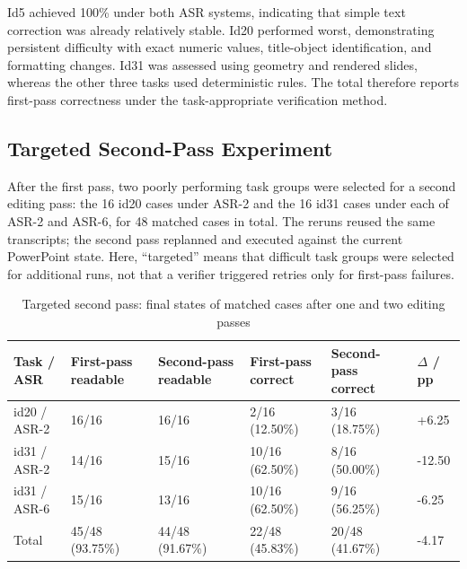 \documentclass[11pt,a4paper,UTF8,fontset=fandol]{ctexart}
\begin{document}
Id5 achieved 100\% under both ASR systems, indicating that simple text correction was already relatively stable. Id20 performed worst, demonstrating persistent difficulty with exact numeric values, title-object identification, and formatting changes. Id31 was assessed using geometry and rendered slides, whereas the other three tasks used deterministic rules. The total therefore reports first-pass correctness under the task-appropriate verification method.

\subsection{Targeted Second-Pass Experiment}

After the first pass, two poorly performing task groups were selected for a second editing pass: the 16 id20 cases under ASR-2 and the 16 id31 cases under each of ASR-2 and ASR-6, for 48 matched cases in total. The reruns reused the same transcripts; the second pass replanned and executed against the current PowerPoint state. Here, ``targeted'' means that difficult task groups were selected for additional runs, not that a verifier triggered retries only for first-pass failures.

\begin{table}[H]
\centering
\caption{Targeted second pass: final states of matched cases after one and two editing passes}
\small
\begin{tabularx}{\textwidth}{Y C{2.1cm} C{2.1cm} C{2.0cm} C{2.0cm} C{1.5cm}}
\toprule
Task / ASR & First-pass readable & Second-pass readable & First-pass correct & Second-pass correct & $\Delta$ / pp \\
\midrule
id20 / ASR-2 & 16/16 & 16/16 & 2/16 (12.50\%) & 3/16 (18.75\%) & +6.25 \\
id31 / ASR-2 & 14/16 & 15/16 & 10/16 (62.50\%) & 8/16 (50.00\%) & -12.50 \\
id31 / ASR-6 & 15/16 & 13/16 & 10/16 (62.50\%) & 9/16 (56.25\%) & -6.25 \\
\midrule
Total & 45/48 (93.75\%) & 44/48 (91.67\%) & 22/48 (45.83\%) & 20/48 (41.67\%) & -4.17 \\
\bottomrule
\end{tabularx}
\end{table}
\end{document}
